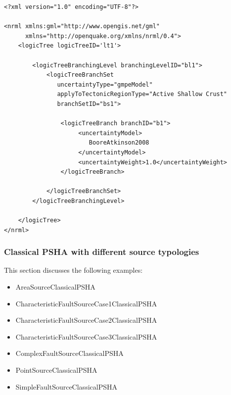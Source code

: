 \begin{Verbatim}[frame=single, commandchars=\\\{\}, fontsize=\normalsize]
<?xml version="1.0" encoding="UTF-8"?>

<nrml xmlns:gml="http://www.opengis.net/gml"
      xmlns="http://openquake.org/xmlns/nrml/0.4">
    <logicTree logicTreeID='lt1'>

        <logicTreeBranchingLevel branchingLevelID="bl1">
            <logicTreeBranchSet
               uncertaintyType="gmpeModel"
               applyToTectonicRegionType="Active Shallow Crust"
               branchSetID="bs1">

                <logicTreeBranch branchID="b1">
                     <uncertaintyModel>
                        BooreAtkinson2008
                     </uncertaintyModel>
                     <uncertaintyWeight>1.0</uncertaintyWeight>
                </logicTreeBranch>

            </logicTreeBranchSet>
        </logicTreeBranchingLevel>

    </logicTree>
</nrml>
\end{Verbatim}

\subsubsection{Classical PSHA with different source typologies}

This section discusses the following examples:
\begin{itemize}
\item AreaSourceClassicalPSHA
\item CharacteristicFaultSourceCase1ClassicalPSHA
\item CharacteristicFaultSourceCase2ClassicalPSHA
\item CharacteristicFaultSourceCase3ClassicalPSHA
\item ComplexFaultSourceClassicalPSHA
\item PointSourceClassicalPSHA
\item SimpleFaultSourceClassicalPSHA
\end{itemize}

